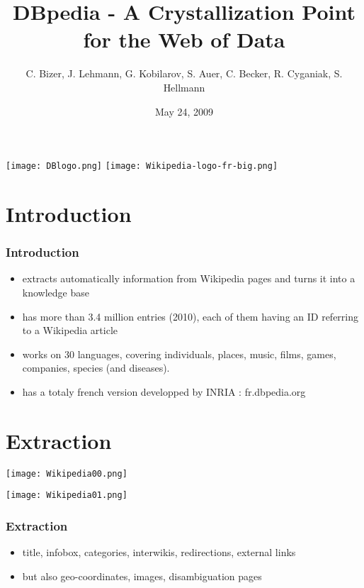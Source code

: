 \documentclass{beamer}
\title{DBpedia - A Crystallization Point for the Web of Data}
\author{C. Bizer, J. Lehmann, G. Kobilarov, S. Auer, C. Becker, R. Cyganiak, S. Hellmann}
\date{May 24, 2009}
\begin{document}
\begin{frame}
	
	\begin{center}
	\texttt{[image: DBlogo.png]} \text{                     } \texttt{[image: Wikipedia-logo-fr-big.png]}
	\end{center}
	\titlepage
\end{frame}

 	\section{Introduction}
\begin{frame}
	\frametitle{Introduction}
	\begin{itemize}
	\item extracts automatically information from Wikipedia pages and turns it into a knowledge base
	\item has more than 3.4 million entries (2010), each of them having an ID referring to a Wikipedia article
	\item works on 30 languages, covering individuals, places, music, films, games, companies, species (and diseases). 
	\item has a totaly french version developped by INRIA : fr.dbpedia.org
	\end{itemize}
\end{frame}


 \section{Extraction}
	\begin{frame}
	\texttt{[image: Wikipedia00.png]}
\end{frame}
	
\begin{frame}
	\texttt{[image: Wikipedia01.png]}
\end{frame}

\begin{frame}
	\frametitle{Extraction}
	\begin{itemize}
	\item title, infobox, categories, interwikis, redirections, external links
	\item but also geo-coordinates, images, disambiguation pages
	\end{itemize}
\end{frame}
\end{document}
